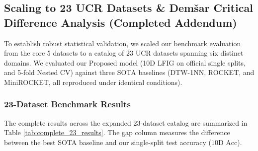 \documentclass[conference]{IEEEtran}
\begin{document}
\subsection{Scaling to 23 UCR Datasets \& Dem\v{s}ar Critical Difference Analysis (Completed Addendum)}

To establish robust statistical validation, we scaled our benchmark evaluation from the core 5 datasets to a catalog of 23 UCR datasets spanning six distinct domains. We evaluated our Proposed model (10D LFIG on official single splits, and 5-fold Nested CV) against three SOTA baselines (DTW-1NN, ROCKET, and MiniROCKET, all reproduced under identical conditions).

\subsubsection{23-Dataset Benchmark Results}
The complete results across the expanded 23-dataset catalog are summarized in Table \ref{tab:complete_23_results}. The gap column measures the difference between the best SOTA baseline and our single-split test accuracy ($10\text{D Acc}$).
\end{document}
